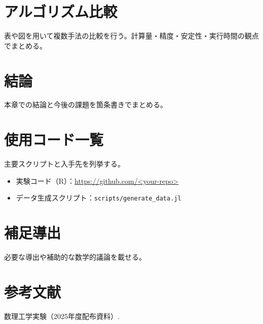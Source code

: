 \documentclass[a4paper,11pt]{ltjsarticle}
\begin{document}


\section{アルゴリズム比較}
表や図を用いて複数手法の比較を行う。計算量・精度・安定性・実行時間の観点でまとめる。

\section{結論}
本章での結論と今後の課題を箇条書きでまとめる。

\appendix
\section{使用コード一覧}
主要スクリプトと入手先を列挙する。
\begin{itemize}
  \item 実験コード（R）：\url{https://github.com/<your-repo>}
  \item データ生成スクリプト：\texttt{scripts/generate\_data.jl}
\end{itemize}

\section{補足導出}
必要な導出や補助的な数学的議論を載せる。

\section*{参考文献}
\begin{thebibliography}{9}
 数理工学実験（2025年度配布資料）.
\end{thebibliography}
\end{document}

